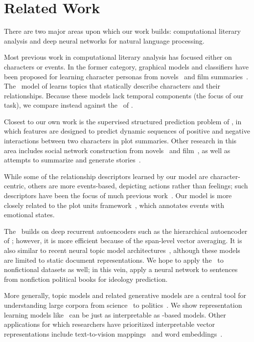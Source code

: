 \section{Related Work}
\label{sec:related}

There are two major areas upon which our work builds: computational literary
analysis and deep neural networks for natural language processing.

Most previous work in computational literary analysis has focused either on
characters or events. In the former category, graphical models and classifiers
have been proposed for learning character personas from
novels~\cite{bamman-underwood-smith:2014:P14-1,flekova2015personality} and film
summaries~\cite{bamman-oconnor-smith:2013:ACL2013}. The \nubbi\ model of
 learns topics that statically describe characters
and their relationships. Because these models lack temporal components (the
focus of our task), we compare instead against the
\htmm\ of .

Closest to our own work is the supervised structured
prediction problem of , in which features are
designed to predict dynamic sequences of positive and negative
interactions between two characters in plot summaries. Other research in this area
includes social network construction from
novels~\cite{elson2010extracting,Srivastava:2016} and film~\cite{krishnan2015youre},
as well as attempts to summarize and generate
stories~\cite{elsner2012character}. 

While some of the relationship descriptors learned by our model are
character-centric, others are more events-based, depicting actions rather than
feelings; such descriptors have been the focus of much previous
work~\cite{schankabelson77,chambers2008unsupervised,chambers2009unsupervised,orr2014learning}. Our
model is more closely related to the plot units
framework~\cite{lehnert1981plot,daume13plotunits}, which annotates events with
emotional states.

The \rmn\ builds on deep recurrent autoencoders such as the hierarchical
 autoencoder of ; however, it is more
efficient because of the span-level vector averaging. It is also similar to
recent neural topic model architectures~\cite{cao2015novel,dasacl2015}, although
these models are limited to static document representations. We hope to apply the \rmn\ to nonfictional datasets as well; in this vein,  apply a neural network to sentences from nonfiction political books for ideology prediction.

More generally, topic models and related generative models are a central tool
for understanding large corpora from science~\cite{talley-11} to
politics~\cite{Nguyen-14b}. We show representation learning models
like \rmn\ can be just as interpretable as -based models. Other
applications for which researchers have prioritized interpretable vector
representations include text-to-vision mappings~\cite{lazaridou2014wampimuk} and
word embeddings~\cite{fyshe2015compositional,faruqui2015sparse}.
